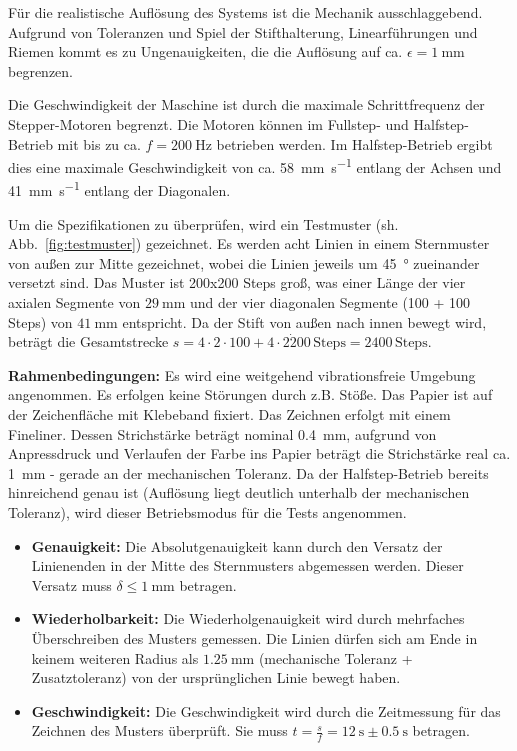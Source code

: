 \documentclass[a4paper,twoside,12pt,DIV=13,BCOR=5mm,numbers=noenddot,cleardoublepage=empty]{scrbook}
\begin{document}
Für die realistische Auflösung des Systems ist die Mechanik ausschlaggebend. Aufgrund von Toleranzen und Spiel der Stifthalterung, Linearführungen und Riemen kommt es zu
Ungenauigkeiten, die die Auflösung auf ca. $\epsilon=\qty{1}{\milli\meter}$ begrenzen.


Die Geschwindigkeit der Maschine ist durch die maximale Schrittfrequenz der Stepper-Motoren begrenzt. Die Motoren können im Fullstep- und Halfstep-Betrieb mit bis zu ca. $f=\qty{200}{\hertz}$ betrieben werden.
Im Halfstep-Betrieb ergibt dies eine maximale Geschwindigkeit von ca. \qty{58}{\milli\meter\per\second} entlang der Achsen und \qty{41}{\milli\meter\per\second} entlang der Diagonalen.


Um die Spezifikationen zu überprüfen, wird ein Testmuster (sh. Abb.~\ref{fig:testmuster}) gezeichnet.
Es werden acht Linien in einem Sternmuster von außen zur Mitte gezeichnet, wobei die Linien jeweils um \qty{45}{\degree} zueinander versetzt sind.
Das Muster ist 200x200 Steps groß, was einer Länge der vier axialen Segmente von $\qty{29}{\milli\meter}$ und der vier diagonalen Segmente (100 + 100 Steps) von $\qty{41}{\milli\meter}$ entspricht.
Da der Stift von außen nach innen bewegt wird, beträgt die Gesamtstrecke $s=4\cdot 2 \cdot 100 + 4 \cdot 2 \dot 200 \,\text{Steps} = 2400 \,\text{Steps}$.

\textbf{Rahmenbedingungen:} Es wird eine weitgehend vibrationsfreie Umgebung angenommen. Es erfolgen keine Störungen durch z.B. Stöße. Das Papier ist
auf der Zeichenfläche mit Klebeband fixiert. Das Zeichnen erfolgt mit einem Fineliner. Dessen Strichstärke beträgt nominal \qty{0.4}{\mm}, aufgrund von Anpressdruck und
Verlaufen der Farbe ins Papier beträgt die Strichstärke real ca. \qty{1}{\mm} - gerade an der mechanischen Toleranz.
Da der Halfstep-Betrieb bereits hinreichend genau ist (Auflösung liegt deutlich unterhalb der mechanischen Toleranz), wird dieser Betriebsmodus für die Tests angenommen.

\begin{itemize}
\item \textbf{Genauigkeit:} Die Absolutgenauigkeit kann durch den Versatz der Linienenden in der Mitte des Sternmusters abgemessen werden. Dieser Versatz muss $\delta\le\qty{1}{\mm}$ betragen.
\item \textbf{Wiederholbarkeit:} Die Wiederholgenauigkeit wird durch mehrfaches Überschreiben des Musters gemessen.
Die Linien dürfen sich am Ende in keinem weiteren Radius als $\qty{1.25}{\mm}$ (mechanische Toleranz + Zusatztoleranz) von der ursprünglichen Linie bewegt haben.
\item \textbf{Geschwindigkeit:} Die Geschwindigkeit wird durch die Zeitmessung für das Zeichnen des Musters überprüft. Sie muss $t=\frac{s}{f}=\qty{12}{\second}\pm\qty{0.5}{\s}$ betragen.
\end{itemize}
\end{document}
